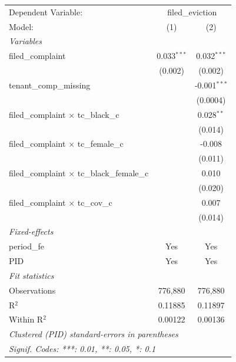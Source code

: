 \par\endgroup
\begingroup
\centering
\begin{tabular}{lcc}
   \tabularnewline \midrule \midrule
   Dependent Variable: & \multicolumn{2}{c}{filed\_eviction}\\
   Model:                                              & (1)           & (2)\\  
   \midrule
   \emph{Variables}\\
   filed\_complaint                                    & 0.033$^{***}$ & 0.032$^{***}$\\   
                                                       & (0.002)       & (0.002)\\   
   tenant\_comp\_missing                               &               & -0.001$^{***}$\\   
                                                       &               & (0.0004)\\   
   filed\_complaint $\times$ tc\_black\_c              &               & 0.028$^{**}$\\   
                                                       &               & (0.014)\\   
   filed\_complaint $\times$ tc\_female\_c             &               & -0.008\\   
                                                       &               & (0.011)\\   
   filed\_complaint $\times$ tc\_black\_female\_c      &               & 0.010\\   
                                                       &               & (0.020)\\   
   filed\_complaint $\times$ tc\_cov\_c                &               & 0.007\\   
                                                       &               & (0.014)\\   
   \midrule
   \emph{Fixed-effects}\\
   period\_fe                                          & Yes           & Yes\\  
   PID                                                 & Yes           & Yes\\  
   \midrule
   \emph{Fit statistics}\\
   Observations                                        & 776,880       & 776,880\\  
   R$^2$                                               & 0.11885       & 0.11897\\  
   Within R$^2$                                        & 0.00122       & 0.00136\\  
   \midrule \midrule
   \multicolumn{3}{l}{\emph{Clustered (PID) standard-errors in parentheses}}\\
   \multicolumn{3}{l}{\emph{Signif. Codes: ***: 0.01, **: 0.05, *: 0.1}}\\
\end{tabular}

